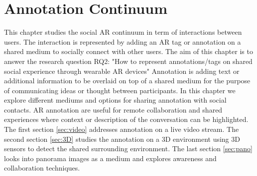 \chapter{Annotation Continuum} %
\label{ch:annotation} %

This chapter studies the social AR continuum in term of interactions between users. The interaction is represented by adding an AR tag or annotation on a shared medium to socially connect with other users. 
The aim of this chapter is to answer the research question RQ2: "How to represent annotations/tags on shared social experience through wearable AR devices"
Annotation is adding text or additional information to be overlaid on top of a shared medium for the purpose of communicating ideas or thought between participants. In this chapter we explore different mediums and options for sharing annotation with social contacts. AR annotation are useful for remote collaboration and shared experiences where context or description of the conversation can be highlighted.  
The first section \ref{sec:video} addresses annotation on a live video stream. The second section \ref{sec:3D} studies the annotation on a 3D environment using 3D sensors to detect the shared surrounding environment. The last section \ref{sec:pano} looks into panorama images as a medium and explores awareness and collaboration techniques. 






